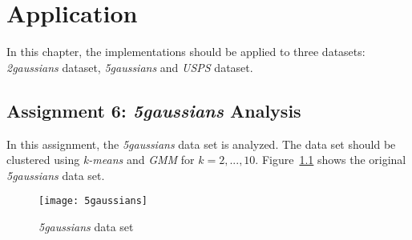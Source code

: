\chapter{Application}
\label{chap:application}

In this chapter, the implementations should be applied to three datasets: \textit{2gaussians} dataset, \textit{5gaussians} and \textit{USPS} dataset.

\section{Assignment 6: \textit{5gaussians} Analysis}
\label{assignment6}

In this assignment, the \textit{5gaussians} data set is analyzed. The data set should be clustered using \textit{k-means} and \textit{GMM} for $k = 2, ..., 10$. Figure~\ref{fig:5gaussians} shows the original \textit{5gaussians} data set.

\begin{figure}[h!]
	\centering
	\texttt{[image: 5gaussians]}
	\caption{\textit{5gaussians} data set}
	\label{fig:5gaussians}
\end{figure}

